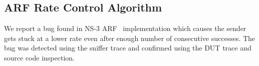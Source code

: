 \subsection{ARF Rate Control Algorithm}
\label{subsec:arf}

We report a bug found in NS-3 ARF~\cite{kamerman1997wavelan} implementation
which causes the sender gets stuck at a lower rate even after enough number of
consecutive successes. The bug was detected using the sniffer trace and
confirmed using the DUT trace and source code inspection.
